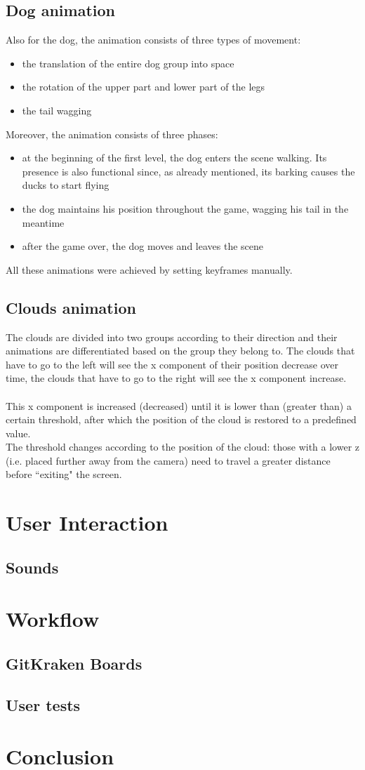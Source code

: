 \documentclass[12pt,a4paper]{article}
\begin{document}
\subsection{Dog animation}
Also for the dog, the animation consists of three types of movement:
\begin{itemize}
	\item the translation of the entire dog group into space
	\item the rotation of the upper part and lower part of the legs
	\item the tail wagging
\end{itemize}
Moreover, the animation consists of three phases:
\begin{itemize}
	\item at the beginning of the first level, the dog enters the scene walking. Its presence is also functional since, as already mentioned, its barking causes the ducks to start flying
	\item the dog maintains his position throughout the game, wagging his tail in the meantime
	\item after the game over, the dog moves and leaves the scene
\end{itemize}
All these animations were achieved by setting keyframes manually. 

\subsection{Clouds animation}
The clouds are divided into two groups according to their direction and their animations are differentiated based on the group they belong to. The clouds that have to go to the left will see the x component of their position decrease over time, the clouds that have to go to the right will see the x component increase.\\\\
This x component is increased (decreased) until it is lower than (greater than) a certain threshold, after which the position of the cloud is restored to a predefined value.\\
The threshold changes according to the position of the cloud: those with a lower z (i.e. placed further away from the camera) need to travel a greater distance before ``exiting" the screen.


\section{User Interaction} \label{user}
\subsection{Sounds}

\section{Workflow}
\subsection{GitKraken Boards}
\subsection{User tests}

\section{Conclusion}
\end{document}
